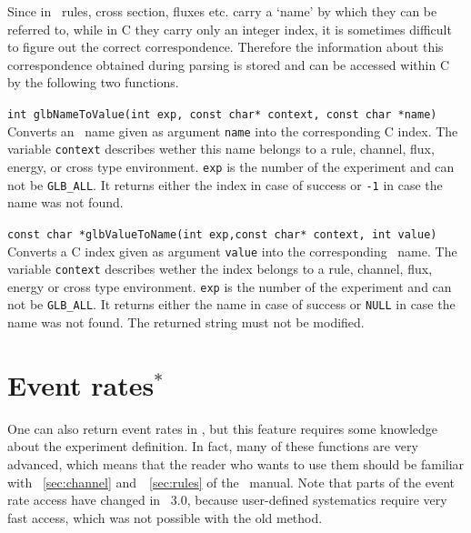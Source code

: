 Since in \AEDL\, rules, cross section, fluxes etc. carry a `name' by
which they can be referred to, while in C they carry only an integer
index, it is sometimes difficult to figure out the correct correspondence.
Therefore the information about this correspondence obtained during
parsing is stored and can be accessed within C by the following two functions.
\begin{function}
{\tt int glbNameToValue(int exp, const char* context, const char *name)}
Converts an \AEDL\ name given as argument {\tt name} into the corresponding
C index. The variable {\tt context} describes wether this name belongs
to a rule, channel, flux, energy, or cross type environment. {\tt exp}
is the number of the experiment and can not be {\tt GLB\_ALL}. It returns
either the index in case of success or {\tt -1} in case the name was not
found. 
\end{function}

\begin{function}
{\tt const char *glbValueToName(int exp,const char* context, int value)}
Converts a C index given as argument {\tt value} into the corresponding 
\AEDL\ name. The variable {\tt context} describes wether the index belongs
to a rule, channel, flux, energy or cross type environment. {\tt exp}
is the number of the experiment and can not be {\tt GLB\_ALL}. It returns
either the name in case of success or {\tt NULL} in case the name was not
found. The returned string must not be modified.
\end{function}




\section{Event rates$^*$}
\label{sec:event_rates}
One can also return event rates in \GLOBES , but this feature
requires some knowledge about the experiment definition. 
In fact, many of these functions are very advanced, which means
that the reader who wants to use them should be familiar with
\Secs~\ref{sec:channel} and~\Sec~\ref{sec:rules} of the \AEDL\ manual.
Note that parts of the event rate access have changed in \GLOBES\ 3.0,
because user-defined systematics require very fast access, which was
not possible with the old method.


